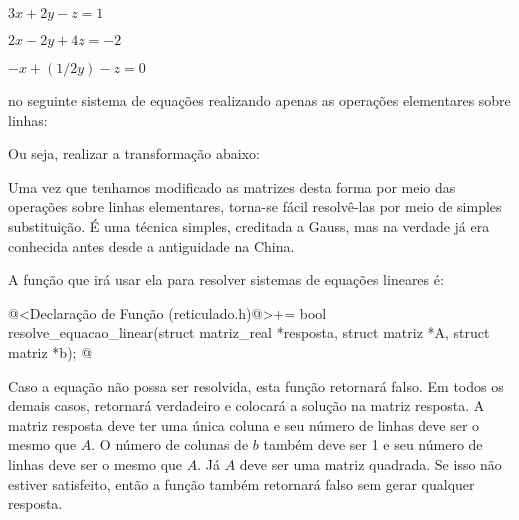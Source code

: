 $3x+2y-z=1$

$2x-2y+4z=-2$

$-x+(1/2y)-z=0$

no seguinte sistema de equações realizando apenas as operações
elementares sobre linhas:


Ou seja, realizar a transformação abaixo:


Uma vez que tenhamos modificado as matrizes desta forma por meio das
operações sobre linhas elementares, torna-se fácil resolvê-las por
meio de simples substituição. É uma técnica simples, creditada a
Gauss, mas na verdade já era conhecida antes desde a antiguidade na
China.

A função que irá usar ela para resolver sistemas de equações lineares
é:

\iniciocodigo
@<Declaração de Função (reticulado.h)@>+=
bool resolve_equacao_linear(struct matriz_real *resposta,
                           struct matriz *A, struct matriz *b);
@
\fimcodigo

Caso a equação não possa ser resolvida, esta função retornará
falso. Em todos os demais casos, retornará verdadeiro e colocará a
solução na matriz resposta. A matriz resposta deve ter uma única
coluna e seu número de linhas deve ser o mesmo que $A$. O número de
colunas de $b$ também deve ser 1 e seu número de linhas deve ser o
mesmo que $A$. Já $A$ deve ser uma matriz quadrada. Se isso não
estiver satisfeito, então a função também retornará falso sem gerar
qualquer resposta.


